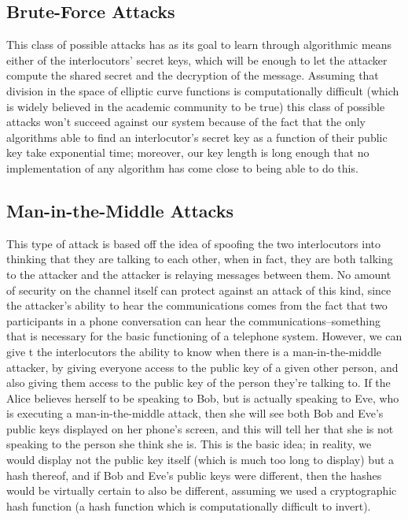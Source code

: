 \documentclass[a4paper]{report}
\begin{document}
\subsection{Brute-Force Attacks} 

This class of possible attacks has as its goal to learn through algorithmic means either of the interlocutors' secret keys, which will be enough to let the attacker compute the shared secret and the decryption of the message. Assuming that division in the space of elliptic curve functions is computationally difficult (which is widely believed in the academic community to be true) this class of possible attacks won't succeed against our system because of the fact that the only algorithms able to find an interlocutor's secret key as a function of their public key take exponential time; moreover, our key length is long enough that no implementation of any algorithm has come close to being able to do this.

\subsection{Man-in-the-Middle Attacks}

This type of attack is based off the idea of spoofing the two interlocutors into thinking that they are talking to each other, when in fact, they are both talking to the attacker and the attacker is relaying messages between them. No amount of security on the channel itself can protect against an attack of this kind, since the attacker's ability to hear the communications comes from the fact that two participants in a phone conversation can hear the communications--something that is necessary for the basic functioning of a telephone system. However, we can give t the interlocutors the ability to know when there is a man-in-the-middle attacker, by giving everyone access to the public key of a given other person, and also giving them access to the public key of the person they're talking to. If the Alice believes herself to be speaking to Bob, but is actually speaking to Eve, who is executing a man-in-the-middle attack, then she will see both Bob and Eve's public keys displayed on her phone's screen, and this will tell her that she is not speaking to the person she think she is. This is the basic idea; in reality, we would display not the public key itself (which is much too long to display) but a hash thereof, and if Bob and Eve's public keys were different, then the hashes would be virtually certain to also be different, assuming we used a cryptographic hash function (a hash function which is computationally difficult to invert).
\end{document}
